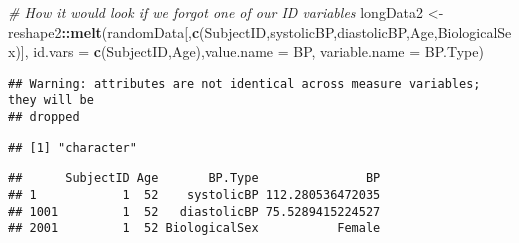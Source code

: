 \documentclass[
]{article}
\newenvironment{Shaded}{\begin{snugshade}}{\end{snugshade}}
\newcommand{\AttributeTok}[1]{\textcolor[rgb]{0.13,0.29,0.53}{#1}}
\newcommand{\CommentTok}[1]{\textcolor[rgb]{0.56,0.35,0.01}{\textit{#1}}}
\newcommand{\DecValTok}[1]{\textcolor[rgb]{0.00,0.00,0.81}{#1}}
\newcommand{\FunctionTok}[1]{\textcolor[rgb]{0.13,0.29,0.53}{\textbf{#1}}}
\newcommand{\NormalTok}[1]{#1}
\newcommand{\OtherTok}[1]{\textcolor[rgb]{0.56,0.35,0.01}{#1}}
\newcommand{\SpecialCharTok}[1]{\textcolor[rgb]{0.81,0.36,0.00}{\textbf{#1}}}
\newcommand{\StringTok}[1]{\textcolor[rgb]{0.31,0.60,0.02}{#1}}
\begin{document}
\begin{Shaded}
\begin{Highlighting}[]
\CommentTok{\# How it would look if we forgot one of our ID variables}
\NormalTok{longData2 }\OtherTok{\textless{}{-}}\NormalTok{ reshape2}\SpecialCharTok{::}\FunctionTok{melt}\NormalTok{(randomData[,}\FunctionTok{c}\NormalTok{(}\StringTok{\textquotesingle{}SubjectID\textquotesingle{}}\NormalTok{,}\StringTok{\textquotesingle{}systolicBP\textquotesingle{}}\NormalTok{,}\StringTok{\textquotesingle{}diastolicBP\textquotesingle{}}\NormalTok{,}\StringTok{\textquotesingle{}Age\textquotesingle{}}\NormalTok{,}\StringTok{\textquotesingle{}BiologicalSex\textquotesingle{}}\NormalTok{)],}
                           \AttributeTok{id.vars =} \FunctionTok{c}\NormalTok{(}\StringTok{\textquotesingle{}SubjectID\textquotesingle{}}\NormalTok{,}\StringTok{\textquotesingle{}Age\textquotesingle{}}\NormalTok{),}\AttributeTok{value.name =} \StringTok{\textquotesingle{}BP\textquotesingle{}}\NormalTok{,}
                           \AttributeTok{variable.name =} \StringTok{\textquotesingle{}BP.Type\textquotesingle{}}\NormalTok{)}
\end{Highlighting}
\end{Shaded}

\begin{verbatim}
## Warning: attributes are not identical across measure variables; they will be
## dropped
\end{verbatim}

\begin{Shaded}
\end{Shaded}

\begin{verbatim}
## [1] "character"
\end{verbatim}

\begin{Shaded}
\end{Shaded}

\begin{verbatim}
##      SubjectID Age       BP.Type               BP
## 1            1  52    systolicBP 112.280536472035
## 1001         1  52   diastolicBP 75.5289415224527
## 2001         1  52 BiologicalSex           Female
\end{verbatim}
\end{document}
